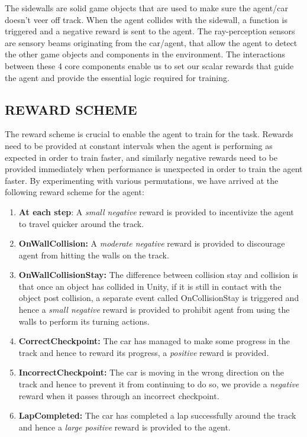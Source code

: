 The sidewalls are solid game objects that are used to make sure the
agent/car doesn't veer off track. When the agent collides with the
sidewall, a function is triggered and a negative reward is sent to the
agent. The ray-perception sensors are sensory beams originating from
the car/agent, that allow the agent to detect the other game objects
and components in the environment. The interactions between these 4
core components enable us to set our scalar rewards that guide the
agent and provide the essential logic required for training.


\subsection{REWARD SCHEME}

The reward scheme is crucial to enable the agent to train for the
task. Rewards need to be provided at constant intervals when the agent
is performing as expected in order to train faster, and similarly
negative rewards need to be provided immediately when performance is
unexpected in order to train the agent faster. By experimenting with
various permutations, we have arrived at the following reward scheme
for the agent:

\begin{enumerate}
\item \textbf{At each step}: A \textit{small negative} reward is
  provided to incentivize the agent to travel quicker around the
  track.
\item \textbf{OnWallCollision:} A \textit{moderate negative} reward is
  provided to discourage agent from hitting the walls on the track.
\item \textbf{OnWallCollisionStay:} The difference between collision
  stay and collision is that once an object has collided in Unity, if
  it is still in contact with the object post collision, a separate
  event called OnCollisionStay is triggered and hence a \textit{small
    negative} reward is provided to prohibit agent from using the
  walls to perform its turning actions.
\item \textbf{CorrectCheckpoint:} The car has managed to make some
  progress in the track and hence to reward its progress, a
  \textit{positive} reward is provided.
\item \textbf{IncorrectCheckpoint:} The car is moving in the wrong
  direction on the track and hence to prevent it from continuing to do
  so, we provide a \textit{negative} reward when it passes through an
  incorrect checkpoint.
\item \textbf{LapCompleted:} The car has completed a lap successfully
  around the track and hence a \textit{large positive} reward is
  provided to the agent.
\end{enumerate}


